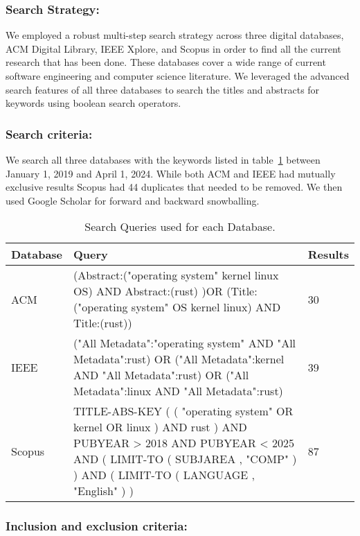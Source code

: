 \documentclass[sigconf]{acmart}
\begin{document}
\subsubsection{Search Strategy:}

We employed a robust multi-step search strategy across three digital databases, ACM Digital Library,
IEEE Xplore, and Scopus in order to find all the current research that has been done. These
databases cover a wide range of current software engineering and computer science literature. We
leveraged the advanced search features of all three databases to search the titles and abstracts for
keywords using boolean search operators.

\subsubsection{Search criteria:}

We search all three databases with the keywords listed in table~\ref{tab:keywords} between January
1, 2019 and April 1, 2024. While both ACM and IEEE had mutually exclusive results Scopus had 44
duplicates that needed to be removed. We then used Google Scholar for forward and backward
snowballing.

\begin{table}
\begin{tabular}{|| p{2cm}| p{4cm} | p{1cm} ||}
 \hline
 Database & Query & Results \\
 \hline\hline
 ACM  & (Abstract:("operating system" kernel linux OS) AND Abstract:(rust) )OR (Title:("operating
 system" OS kernel linux) AND Title:(rust))  & 30 \\
 IEEE & ("All Metadata":"operating system" AND "All Metadata":rust) OR ("All Metadata":kernel AND
 "All Metadata":rust) OR ("All Metadata":linux AND "All Metadata":rust) & 39 \\
 Scopus & TITLE-ABS-KEY ( ( "operating system" OR kernel OR linux ) AND rust ) AND PUBYEAR > 2018
 AND PUBYEAR < 2025 AND ( LIMIT-TO ( SUBJAREA , "COMP" ) ) AND ( LIMIT-TO ( LANGUAGE , "English" ) )
 & 87 \\
 \hline
\end{tabular}
\caption{Search Queries used for each Database.}
\label{tab:keywords}
\end{table}

\subsubsection{Inclusion and exclusion criteria:}
\end{document}
